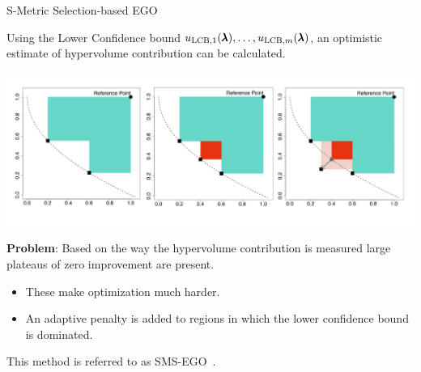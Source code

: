 \begin{frame}[allowframebreaks]{S-Metric Selection-based EGO}

    Using the Lower Confidence bound $u_{\text{LCB}, 1}(\pmb{\lambda}), \dots, u_{\text{LCB}, m}(\pmb{\lambda})$, an optimistic estimate of hypervolume contribution can be calculated.

    \begin{center}
        \includegraphics[scale=0.35]{images/hv_contribution_2}
    \end{center}

    \framebreak

    \textbf{Problem}: Based on the way the hypervolume contribution is measured large plateaus of zero improvement are present.
    \begin{itemize}
        \item These make optimization much harder.
         \item An adaptive penalty is added to regions in which the lower confidence bound is dominated.
    \end{itemize}

    \vspace{0.5cm}

        This method is referred to as SMS-EGO~.
\end{frame}

